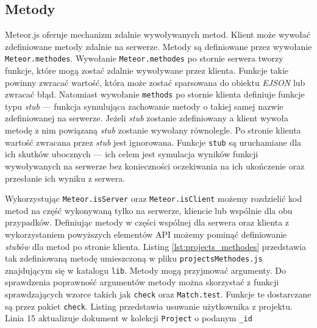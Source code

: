 \subsection{Metody}
Meteor.js oferuje mechanizm zdalnie wywoływanych metod. Klient może wywołać zdefiniowane metody zdalnie na serwerze. Metody są definiowane przez wywołanie \verb|Meteor.methodes|. Wywołanie \verb|Meteor.methodes| po stornie serwera tworzy funkcje, które mogą zostać zdalnie wywoływane przez klienta. Funkcje takie powinny zwracać wartość, która może zostać sparsowana do obiektu \textit{EJSON} lub zwracać błąd. Natomiast wywołanie \verb|methods| po stornie klienta definiuje funkcje typu \textit{stub} --- funkcja symulująca zachowanie metody o takiej samej nazwie  zdefiniowanej na serwerze. Jeżeli \textit{stub} zostanie zdefiniowany a klient wywoła metodę z nim powiązaną \textit{stub} zostanie wywołany równolegle. Po stronie klienta wartość zwracana przez \textit{stub} jest ignorowana. Funkcje \verb|stub| są uruchamiane dla ich skutków ubocznych --- ich celem jest symulacja wyników funkcji wywoływanych na serwerze bez konieczności oczekiwania na ich ukończenie oraz przesłanie ich wyniku z serwera.

Wykorzystując \verb|Meteor.isServer| oraz \verb|Meteor.isClient| możemy rozdzielić kod metod na część wykonywaną tylko na serwerze, kliencie lub wspólnie dla obu przypadków. Definiując metody w części wspólnej dla serwera oraz klienta z wykorzystaniem powyższych elementów API możemy pominąć definiowanie \textit{stubów} dla metod po stronie klienta. Listing \ref{lst:projects_methodes} przedstawia  tak zdefiniowaną metodę umieszczoną w  pliku \verb|projectsMethodes.js| znajdującym się w katalogu \verb|lib|. Metody mogą przyjmować argumenty. Do sprawdzenia poprawność argumentów metody można skorzystać z funkcji sprawdzających wzorce takich jak \verb|check| oraz \verb|Match.test|. Funkcje te dostarczane są przez pakiet \verb|check|. Listing przedstawia usuwanie użytkownika z projektu. Linia 15 aktualizuje dokument w kolekcji \verb|Project| o podanym \verb|_id|

